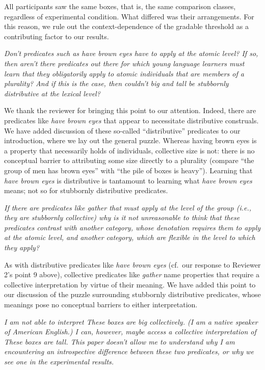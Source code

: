 \documentclass[12pt]{article}
\begin{document}
All participants saw the same boxes, that is, the same comparison classes, regardless of experimental condition. What differed was their arrangements. For this reason, we rule out the context-dependence of the gradable threshold as a contributing factor to our results.

\item \emph{Don't predicates such as \emph{have brown eyes} have to apply at the atomic level? If so, then aren't there predicates out there for which young language learners must learn that they obligatorily apply to atomic individuals that are members of a plurality? And if this is the case, then couldn't \emph{big} and \emph{tall} be stubbornly distributive at the lexical level?}

We thank the reviewer for bringing this point to our attention. Indeed, there are predicates like \emph{have brown eyes} that appear to necessitate distributive construals. We have added discussion of these so-called ``distributive'' predicates to our introduction, where we lay out the general puzzle. Whereas having brown eyes is a property that necessarily holds of individuals, collective size is not: there is no conceptual barrier to attributing some size directly to a plurality (compare ``the group of men has brown eyes'' with ``the pile of boxes is heavy''). Learning that \emph{have brown eyes} is distributive is tantamount to learning what \emph{have brown eyes} means; not so for stubbornly distributive predicates.

\item \emph{If there are predicates like \emph{gather} that must apply at the level of the group (i.e., they are stubbornly collective) why is it not unreasonable to think that these predicates contrast with another category, whose denotation requires them to apply at the atomic level, and another category, which are flexible in the level to which they apply?}

As with distributive predicates like \emph{have brown eyes} (cf.~our response to Reviewer 2's point 9 above), collective predicates like \emph{gather} name properties that require a collective interpretation by virtue of their meaning. We have added this point to our discussion of the puzzle surrounding stubbornly distributive predicates, whose meanings pose no conceptual barriers to either interpretation.

\item \emph{I am not able to interpret \emph{These boxes are big} collectively. (I am a native speaker of American English.) I can, however, maybe access a collective interpretation of \emph{These boxes are tall}. This paper doesn't allow me to understand why I am encountering an introspective difference between these two predicates, or why we see one in the experimental results.}
\end{document}
